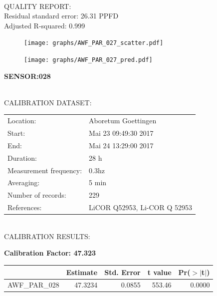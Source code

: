 \documentclass[oneside]{report}
\begin{document}
\hrulefill\\
QUALITY REPORT:\\
Residual standard error: 26.31 PPFD\\
Adjusted R-squared: 0.999



\begin{figure}[H]
  \centering
  \texttt{[image: graphs/AWF\_PAR\_027\_scatter.pdf]}
\end{figure}




\begin{figure}[H]
  \centering
  \texttt{[image: graphs/AWF\_PAR\_027\_pred.pdf]}
\end{figure}

\pagebreak


\begin{center}
\large{\textbf{SENSOR:028}}\\
\end{center}

\hrulefill\\
CALIBRATION DATASET:\\
\begin{table}[h!]
  \centering
  \label{tab:table1}
  \begin{tabular}{ll}
    Location: & Aboretum Goettingen\\ 
    
    
    Start:  & Mai 23 09:49:30 2017 \\
    End:   & Mai 24 13:29:00 2017\\ 
    Duration: & 28 h\\
    Measurement frequency: & 0.3hz\\
    Averaging:  &5 min\\
    Number of records: & 229 \\
    References: & LiCOR Q52953, Li-COR Q 52953 \\
  \end{tabular}
\end{table}

\hrulefill\\
CALIBRATION RESULTS:\\


\begin{center}
\textbf{\large{Calibration Factor: 47.323}}\\
\end{center}
\begin{table}[ht]
\centering
\begin{tabular}{rrrrr}
  \hline
 & Estimate & Std. Error & t value & Pr($>$$|$t$|$) \\ 
  \hline
AWF\_PAR\_028 & 47.3234 & 0.0855 & 553.46 & 0.0000 \\ 
   \hline
\end{tabular}
\end{table}
\end{document}
